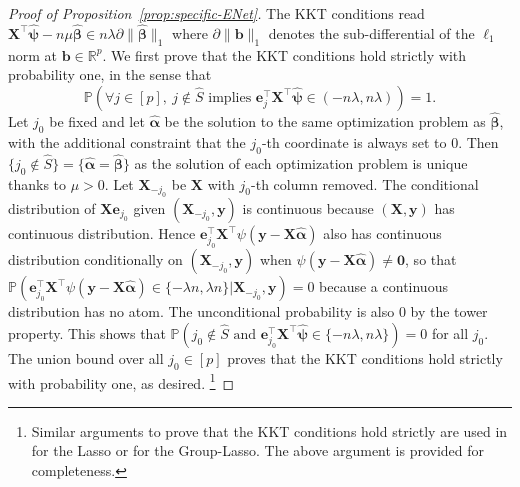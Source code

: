 \documentclass[11pt]{amsart}
\numberwithin{equation}{section}
\numberwithin{equation}{section}
\def\real{{\mathbb{R}}}
\def\R{{\real}}
\def\P{{\mathbb{P}}}
\def\mathbold{\boldsymbol} %
\def\bb{\mathbold{b}}\def\bhat{\widehat{b}}\def\btil{\widetilde{b}}
\def\be{\mathbold{e}}
\def\bX{\mathbold{X}}\def\hbX{{\widehat{\bX}}}\def\tbX{{\widetilde{\bX}}}\def\bXbar{{\overline \bX}}
\def\by{\mathbold{y}}\def\yhat{\widehat{y}}\def\ytil{\widetilde{y}}\def\ybar{{\overline y}}\def\vby{{\bf y}}
\def\balpha{\mathbold{\alpha}}\def\alphahat{\widehat{\alpha}}\def\halpha{\widehat{\alpha}}
\def\hbalpha{{\widehat{\balpha}}}\def\tbalpha{{\widetilde{\balpha}}}
\def\bbeta{\mathbold{\beta}}\def\betahat{\widehat{\beta}}\def\hbeta{\widehat{\beta}}
\def\hbbeta{{{\widehat{\bbeta}}}}
\def\bpsi{\mathbold{\psi}}\def\psihat{\widehat{\psi}}\def\hpsi{\widehat{\psi}}
\def\hbpsi{{\widehat{\bpsi}}}\def\tbpsi{{\widetilde{\bpsi}}}
\begin{document}
\begin{proof}[Proof of Proposition~\ref{prop:specific-ENet}]
    The KKT conditions read
    $\bX^\top\hbpsi - n\mu\hbbeta \in n\lambda \partial \|\hbbeta\|_1$ 
    where $\partial \|\bb\|_1$ denotes the sub-differential of the $\ell_1$ norm at $\bb\in\R^p$.
    We first prove that the KKT conditions hold strictly
    with probability one, in the sense that
    $$\P(\forall j\in[p], ~ j\notin\hat S \text{ implies }\be_j^\top\bX^\top\hbpsi
    \in (-n\lambda,n\lambda) )=1.$$
    Let $j_0$ be fixed and let $\hbalpha$ be the solution
    to the same optimization problem as $\hbbeta$,
    with the additional constraint 
    that the $j_0$-th coordinate is always set to 0.
    Then $\{j_0\not \in \hat S\} = \{\hbalpha = \hbbeta \}$
    as the solution of each optimization problem is unique
    thanks to $\mu>0$.
    Let $\bX_{-j_0}$ be $\bX$ with $j_0$-th column removed.
    The conditional distribution of
    $\bX\be_{j_0}$ given $(\bX_{-j_0},\by)$ is continuous
    because $(\bX,\by)$ has continuous distribution.
    Hence
    $\be_{j_0}^\top \bX^\top\psi(\by - \bX\hbalpha)$ also has continuous
    distribution conditionally on $(\bX_{-j_0},\by)$ when
    $\psi(\by - \bX\hbalpha)\ne \mathbf{0}$, so that
    $\P(\be_{j_0}^\top \bX^\top\psi(\by - \bX\hbalpha) \in \{-\lambda n, \lambda n\} | \bX_{-j_0},\by) = 0$
    because a continuous distribution has no atom.
    The unconditional probability is also 0 by the tower property.
    This shows that
    $\P(j_0\not\in \hat S \text{ and }
    \be_{j_0}^\top\bX^\top\hbpsi
    \in \{-n\lambda,n\lambda\} )=0$ for all $j_0$. The union
    bound over all $j_0\in[p]$ proves that the KKT conditions
    hold strictly with probability one, as desired.
    \footnote{
    Similar arguments to prove that the KKT conditions hold
    strictly are used in \cite[Proposition 3.9]{bellec_zhang2018second_stein}
    for the Lasso
    or \cite[Lemma L.1]{bellec_zhang2019second_poincare} for the Group-Lasso.
    The above argument is provided for completeness.}


\end{proof}
\end{document}
